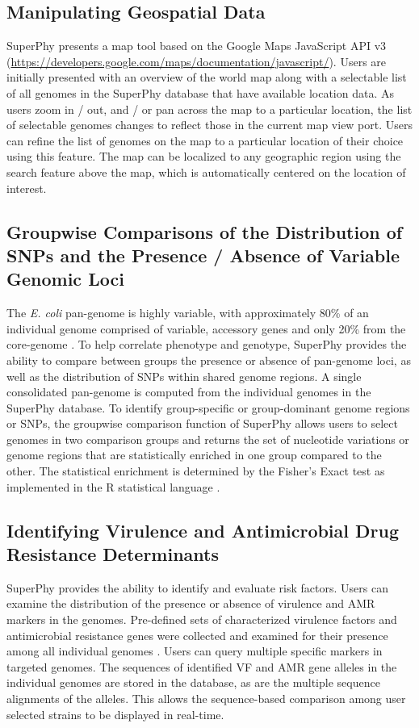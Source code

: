 \documentclass[a4paper,twoside]{article}
\begin{document}
{\subsection{Manipulating Geospatial Data}
SuperPhy presents a map tool based on the Google Maps JavaScript API v3 (\url{https://developers.google.com/maps/documentation/javascript/}). Users are initially presented with an overview of the world map along with a selectable list of all genomes in the SuperPhy database that have available location data. As users zoom in / out, and / or pan across the map to a particular location, the list of selectable genomes changes to reflect those in the current map view port. Users can refine the list of genomes on the map to a particular location of their choice using this feature. The map can be localized to any geographic region using the search feature above the map, which is automatically centered on the location of interest.  

\subsection{Groupwise Comparisons of the Distribution of SNPs and the Presence / Absence of Variable Genomic Loci}

The \textit{E. coli} pan-genome is highly variable, with approximately 80\% of an individual genome comprised of variable, accessory genes and only 20\% from the core-genome \cite{lukjancenko_comparison_2010}. To help correlate phenotype and genotype, SuperPhy provides the ability to compare between groups the presence or absence of pan-genome loci, as well as the distribution of SNPs within shared genome regions. A single consolidated pan-genome is computed from the individual genomes in the SuperPhy database. To identify group-specific or group-dominant genome regions or SNPs, the groupwise comparison function of SuperPhy allows users to select genomes in two comparison groups and returns the set of nucleotide variations or genome regions that are statistically enriched in one group compared to the other. The statistical enrichment is determined by the Fisher's Exact test as implemented in the R statistical language \cite{R_manual}.


\subsection{Identifying Virulence and Antimicrobial Drug Resistance Determinants}

SuperPhy provides the ability to identify and evaluate risk factors. Users can examine the distribution of the presence or absence of virulence and AMR markers in the genomes.  Pre-defined sets of characterized virulence factors and antimicrobial resistance genes were collected and examined for their presence among all individual genomes \cite{mcarthur2012card,chen2012vfdb,chen2005vfdb}. Users can query multiple specific markers in targeted genomes. The sequences of identified VF and AMR gene alleles in the individual genomes are stored in the database, as are the multiple sequence alignments of the alleles. This allows the sequence-based comparison among user selected strains to be displayed in real-time. 

}
\end{document}
